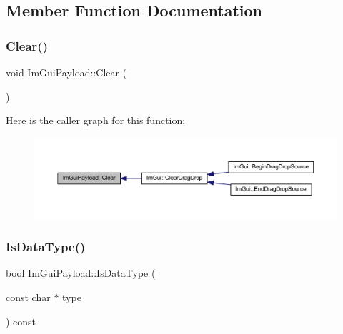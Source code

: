 \subsection{Member Function Documentation}
\mbox{\label{struct_im_gui_payload_a88c2293d356eb05e7a30d7693de186f2}} 
\subsubsection{\texorpdfstring{Clear()}{Clear()}}
{\footnotesize\ttfamily void Im\+Gui\+Payload\+::\+Clear (\begin{DoxyParamCaption}{ }\end{DoxyParamCaption})\hspace{0.3cm}{\ttfamily [inline]}}

Here is the caller graph for this function\+:
\nopagebreak
\begin{figure}[H]
\begin{center}
\leavevmode
\includegraphics[width=350pt]{struct_im_gui_payload_a88c2293d356eb05e7a30d7693de186f2_icgraph}
\end{center}
\end{figure}
\mbox{\label{struct_im_gui_payload_a7864aeb80bc28683748d015562eead4d}} 
\subsubsection{\texorpdfstring{Is\+Data\+Type()}{IsDataType()}}
{\footnotesize\ttfamily bool Im\+Gui\+Payload\+::\+Is\+Data\+Type (\begin{DoxyParamCaption}\item[{const char $\ast$}]{type }\end{DoxyParamCaption}) const\hspace{0.3cm}{\ttfamily [inline]}}

